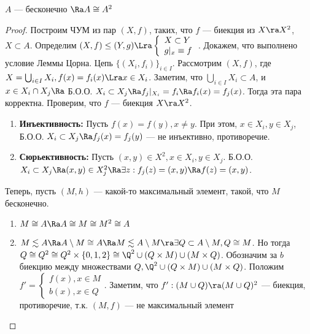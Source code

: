 \begin{theorem}
    \(A\) --- бесконечно \(\Ra A \cong A^2\)
\end{theorem}
\begin{proof}
    Построим ЧУМ из пар \((X, f)\), таких, что \(f\) --- биекция из \(X \ra X^2\), \(X \subset A\). Определим \((X, f) \le (Y, g) \Lra \left\{\begin{array}{l}
        X \subset Y \\
        g|_x \equiv f
    \end{array}\right.\).
    Докажем, что выполнено условие Леммы Цорна. Цепь \(\{(X_i, f_i)\}_{i \in I}\). Рассмотрим \(\left(X, f\right)\), где \(X = \bigcup_{i \in I} X_i, f(x) = f_i(x) \Lra x \in X_i\). Заметим, что \(\bigcup_{i \in I} X_i \subset A\), и \(x \in X_i \cap X_j \Ra \) Б.О.О. \(X_i \subset X_j \Ra f_j|_{X_i} = f_i \Ra f_i(x) = f_j(x)\). Тогда эта пара корректна. Проверим, что \(f\) --- биекция \(X \ra X^2\).
    \begin{enumerate}
        \item[] \textbf{Инъективность:} Пусть \(f(x) = f(y), x \ne y\). При этом, \(x \in X_i, y \in X_j\), Б.О.О. \(X_i \subset X_j \Ra f_j(x) = f_j(y)\) --- не инъективно, противоречие.
        \item[] \textbf{Сюрьективность:} Пусть \((x, y) \in X^2, x \in X_i, y \in X_j\). Б.О.О. \(X_i \subset X_j \Ra (x, y) \in X_j^2 \Ra \exists z: f_j(z) = (x, y) \Ra f(z) = (x, y)\).
    \end{enumerate}
    Теперь, пусть \((M, h)\) --- какой-то максимальный элемент, такой, что \(M\) бесконечно.
    \begin{enumerate}
        \item \(M \cong A \Ra A \cong M \cong M^2 \cong A\)
        \item \(M \lesssim A \Ra A \setminus M \cong A \Ra M \lesssim A \setminus M \ra \exists Q \subset A \setminus M, Q \cong M\). Но тогда \(Q \cong Q^2 \cong Q^2 \times \{0, 1, 2\} \cong \Q^2 \cup (Q\times M) \cup (M \times Q)\). Обозначим за \(b\) биекцию между множествами \(Q, \Q^2 \cup (Q\times M) \cup (M \times Q)\). Положим \(f' = \left\{\begin{array}{l}
            f(x), x \in M \\
            b(x), x \in Q
        \end{array}\right.\). Заметим, что \(f': (M \cup Q) \ra (M \cup Q)^2\) --- биекция, противоречие, т.к. \((M, f)\) --- не максимальный элемент
    \end{enumerate}
\end{proof}

